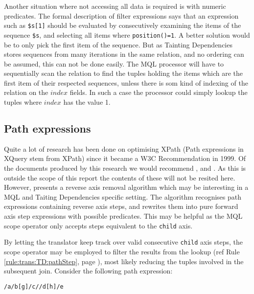 Another situation where not accessing all data is required is with numeric predicates. The formal description of
filter expressions\cite{xquery_semantics} says that an expression such as
\texttt{\$s[1]} should be evaluated by consecutively examining the items of the sequence \texttt{\$s}, and selecting all items where
\texttt{position()=1}. A better solution would be to only pick the first item of the sequence. But as Tainting
Dependencies stores sequences from many iterations in the same relation, and no ordering can be assumed, this can
not be done easily. The MQL processor will have to sequentially scan the relation to find the tuples holding the
items which are the first item of their respected sequences, unless there is som kind of indexing of the relation
on the $index$ fields. In such a case the processor could simply lookup the tuples where $index$ has the value 1.

\subsection{Path expressions}
\label{sect:disc:optim:path}
Quite a lot of research has been done on optimising XPath (Path expressions in XQuery stem from XPath) since it
became a W3C Recommendation in 1999. Of the documents produced by this research we would recommend
\cite{optimize_logic}, \cite{optimize_michiels} and \cite{optimize_xsltPath}. As this is outside the scope of this
report the contents of these will not be resited here. However, \cite{optimize_forward} presents a reverse axis
removal algorithm which may be interesting in a MQL and Taiting Dependencies
specific setting. The algorithm recognises path expressions containing reverse axis steps, and rewrites them into pure forward axis step
expressions with possible predicates. This may be helpful as the MQL \textsf{scope} operator only accepts steps
equivalent to the \texttt{child} axis.

By letting the translator keep track over valid consecutive \texttt{child} axis steps, the \textsf{scope} operator
may be employed to filter the results from the lookup (ref Rule \ref{rule:trans:TD:pathStep}, page
\pageref{rule:trans:TD:pathStep}), most likely reducing the tuples involved in the subsequent join. Consider the
following path expression:

\begin{center}
\texttt{/a/b[g]/c//d[h]/e}
\end{center}

